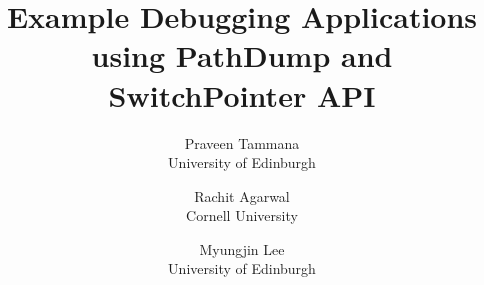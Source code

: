 \documentclass[10pt,onecolumn]{article}
\begin{document}
\date{}

\title{\Large \bf Example Debugging Applications using PathDump and SwitchPointer API}

\author{
  {\rm Praveen Tammana} \\
  {University of Edinburgh}
  \and
  {\rm Rachit Agarwal} \\
  {Cornell University}
  \and
  {\rm Myungjin Lee} \\
  {University of Edinburgh}
} %

\maketitle



{ 
\balance
% 


}
\end{document}
